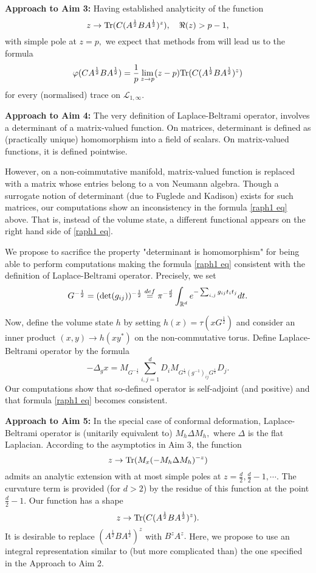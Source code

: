 \documentclass{article}
\begin{document}
{\bf Approach to Aim 3:} Having established analyticity of the function
$$z\to {\rm Tr}(C(A^{\frac12}BA^{\frac12})^z),\quad \Re(z)>p-1,$$
with simple pole at $z=p,$ we expect that methods from \cite{SUZ-indiana} will lead us to the formula
$$\varphi(CA^{\frac12}BA^{\frac12})=\frac1p\lim_{z\to p}(z-p){\rm Tr}(C(A^{\frac12}BA^{\frac12})^z)$$
for every (normalised) trace on $\mathcal{L}_{1,\infty}.$

{\bf Approach to Aim 4:} The very definition of Laplace-Beltrami operator, involves a determinant of a matrix-valued function. On matrices, determinant is defined as (practically unique) homomorphism into a field of scalars. On matrix-valued functions, it is defined pointwise.

However, on a non-coimmutative manifold, matrix-valued function is replaced with a matrix whose entries belong to a von Neumann algebra. Though a surrogate notion of determinant (due to Fuglede and Kadison) exists for such matrices, our computations show an inconsistency in the formula \eqref{raph1 eq} above. That is, instead of the volume state, a different functional appears on the right hand side of \eqref{raph1 eq}.

We propose to sacrifice the property "determinant is homomorphism" for being able to perform computations making the formula \eqref{raph1 eq} consistent with the definition of Laplace-Beltrami operator. Precisely, we set 
$$G^{-\frac12}=({\rm det}(g_{ij}))^{-\frac12}\stackrel{def}{=}\pi^{-\frac{d}{2}}\int_{\mathbb{R}^d}e^{-\sum_{i,j}g_{ij}t_it_j}dt.$$

Now, define the volume state $h$ by setting $h(x)=\tau(xG^{\frac12})$ and consider an inner product $(x,y)\to h(xy^*)$ on the non-commutative torus. Define Laplace-Beltrami operator by the formula
$$-\Delta_g x=M_{G^{-\frac12}}\sum_{i,j=1}^dD_iM_{G^{\frac14}(g^{-1})_{ij}G^{\frac14}}D_j.$$
Our computations show that so-defined operator is self-adjoint (and positive) and that formula \eqref{raph1 eq} becomes consistent.

{\bf Approach to Aim 5:} In the special case of conformal deformation, Laplace-Beltrami operator is (unitarily equivalent to) $M_h\Delta M_h,$ where $\Delta$ is the flat Laplacian. According to the asymptotics in Aim 3, the function
$$z\to {\rm Tr}(M_x(-M_h\Delta M_h)^{-z})$$
admits an analytic extension with at most simple poles at $z=\frac{d}{2},\frac{d}{2}-1,\cdots.$ The curvature term is provided (for $d>2$) by the residue of this function at the point $\frac{d}{2}-1.$ Our function has a shape
$$z\to {\rm Tr}(C(A^{\frac12}BA^{\frac12})^z).$$
It is desirable to replace $(A^{\frac12}BA^{\frac12})^z$ with $B^zA^z.$ Here, we propose to use an integral representation similar to (but more complicated than) the one specified in  the Approach to Aim 2.
\end{document}
